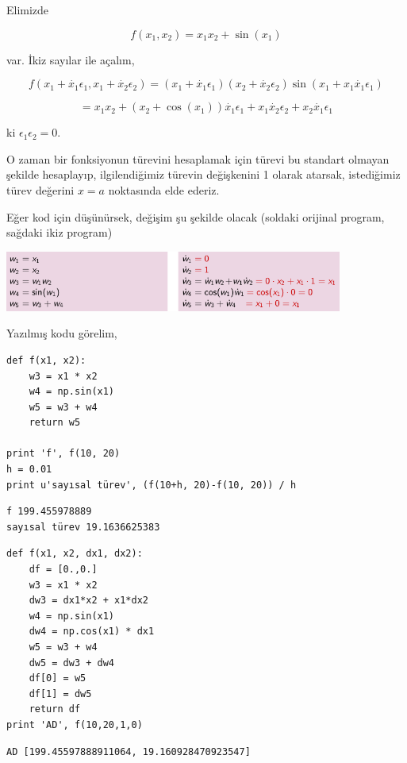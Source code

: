 \documentclass[12pt,fleqn]{article}\usepackage{../../common}
\begin{document}
Elimizde 

$$ f(x_1,x_2) = x_1x_2 + \sin(x_1)$$

var. İkiz sayılar ile açalım, 

$$ f(x_1 + \dot{x_1}\epsilon_1, x_1 + \dot{x_2}\epsilon_2) = 
(x_1 + \dot{x_1}\epsilon_1)(x_2 + \dot{x_2}\epsilon_2) \sin(x_1+x_1\dot{x_1}\epsilon_1)
$$

$$ 
= x_1x_2 + (x_2 + \cos(x_1))\dot{x_1}\epsilon_1 
+ x_1\dot{x_2}\epsilon_2
+ x_2\dot{x_1}\epsilon_1
$$

ki $\epsilon_1\epsilon_2 = 0$. 

O zaman bir fonksiyonun türevini hesaplamak için türevi bu standart olmayan
şekilde hesaplayıp, ilgilendiğimiz türevin değişkenini 1 olarak atarsak,
istediğimiz türev değerini $x=a$ noktasında elde ederiz.

Eğer kod için düşünürsek, değişim şu şekilde olacak (soldaki orijinal
program, sağdaki ikiz program) 

\includegraphics[width=30em]{autodiff_02.png}

Yazılmış kodu görelim,

\begin{verbatim}
def f(x1, x2):
    w3 = x1 * x2
    w4 = np.sin(x1)
    w5 = w3 + w4
    return w5

print 'f', f(10, 20)
h = 0.01
print u'sayısal türev', (f(10+h, 20)-f(10, 20)) / h
\end{verbatim}

\begin{verbatim}
f 199.455978889
sayısal türev 19.1636625383
\end{verbatim}

\begin{verbatim}
def f(x1, x2, dx1, dx2):
    df = [0.,0.]
    w3 = x1 * x2
    dw3 = dx1*x2 + x1*dx2    
    w4 = np.sin(x1)
    dw4 = np.cos(x1) * dx1    
    w5 = w3 + w4
    dw5 = dw3 + dw4
    df[0] = w5
    df[1] = dw5
    return df
print 'AD', f(10,20,1,0)
\end{verbatim}

\begin{verbatim}
AD [199.45597888911064, 19.160928470923547]
\end{verbatim}
\end{document}
